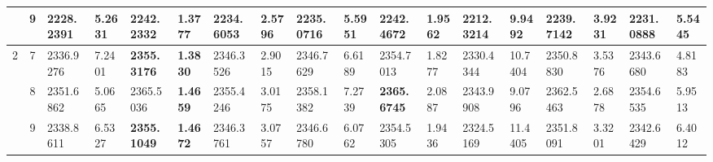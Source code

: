 \documentclass[conference]{IEEEtran}
\begin{document}
\begin{table*}[]
\begin{tabular}{|cc|ll|ll|ll|ll|ll|ll|ll|ll|}
		\multicolumn{1}{|c|}{}                            & 9                               & \multicolumn{1}{l|}{2228.2391}         & 5.2631                            & \multicolumn{1}{l|}{2242.2332}          & \textbf{1.3777}                   & \multicolumn{1}{l|}{2234.6053}         & 2.5796                            & \multicolumn{1}{l|}{2235.0716}         & 5.5951                            & \multicolumn{1}{l|}{\textbf{2242.4672}} & 1.9562                            & \multicolumn{1}{l|}{2212.3214}         & 9.9492                            & \multicolumn{1}{l|}{2239.7142}         & 3.9231                            & \multicolumn{1}{l|}{2231.0888}         & 5.5445                            \\ \hline
		\multicolumn{1}{|c|}{\multirow{3}{*}{2}}          & 7                               & \multicolumn{1}{l|}{2336.9276}         & 7.2401                            & \multicolumn{1}{l|}{\textbf{2355.3176}} & \textbf{1.3830}                   & \multicolumn{1}{l|}{2346.3526}         & 2.9015                            & \multicolumn{1}{l|}{2346.7629}         & 6.6189                            & \multicolumn{1}{l|}{2354.7013}          & 1.8277                            & \multicolumn{1}{l|}{2330.4344}         & 10.7404                           & \multicolumn{1}{l|}{2350.8830}         & 3.5376                            & \multicolumn{1}{l|}{2343.6680}         & 4.8183                            \\ \cline{2-18} 
		\multicolumn{1}{|c|}{}                            & 8                               & \multicolumn{1}{l|}{2351.6862}         & 5.0665                            & \multicolumn{1}{l|}{2365.5036}          & \textbf{1.4659}                   & \multicolumn{1}{l|}{2355.4246}         & 3.0175                            & \multicolumn{1}{l|}{2358.1382}         & 7.2739                            & \multicolumn{1}{l|}{\textbf{2365.6745}} & 2.0887                            & \multicolumn{1}{l|}{2343.9908}         & 9.0796                            & \multicolumn{1}{l|}{2362.5463}         & 2.6878                            & \multicolumn{1}{l|}{2354.6535}         & 5.9513                            \\ \cline{2-18} 
		\multicolumn{1}{|c|}{}                            & 9                               & \multicolumn{1}{l|}{2338.8611}         & 6.5327                            & \multicolumn{1}{l|}{\textbf{2355.1049}} & \textbf{1.4672}                   & \multicolumn{1}{l|}{2346.3761}         & 3.0757                            & \multicolumn{1}{l|}{2346.6780}         & 6.0762                            & \multicolumn{1}{l|}{2354.5305}          & 1.9436                            & \multicolumn{1}{l|}{2324.5169}         & 11.4405                           & \multicolumn{1}{l|}{2351.8091}         & 3.3201                            & \multicolumn{1}{l|}{2342.6429}         & 6.4012                            \\ \hline

\end{tabular}
\end{table*}
\end{document}
